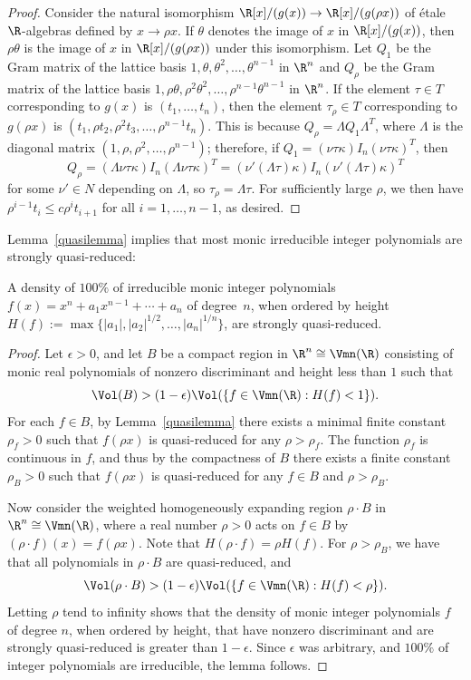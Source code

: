\begin{proof}
Consider the natural isomorphism $\R[x]/(g(x))\to \R[x]/(g(\rho x))$
of \'etale $\R$-algebras defined by $x\to\rho x$.  If $\theta$ denotes
the image of $x$ in $\R[x]/(g(x))$, then $\rho\theta$ is the image of
$x$ in $\R[x]/(g(\rho x))$ under this isomorphism.
Let $Q_1$ be the Gram matrix of the lattice basis
$1,\theta,\theta^2,\ldots,\theta^{n-1}$ in
$\R^{n}$ and $Q_\rho$ be the Gram matrix of the lattice basis
$1,\rho\theta,\rho^2\theta^2,\ldots,\rho^{n-1}\theta^{n-1}$ in
$\R^{n}$.  If the element $\tau \in T$
corresponding to $g(x)$ is $(t_1,\ldots,t_n)$, then the element
$\tau_\rho\in T$ corresponding to $g(\rho x)$ is $(t_1,\rho t_2,\rho^2
t_3,\ldots,\rho^{n-1}t_n)$. This is because $Q_\rho=\Lambda
Q_1\Lambda^T$, where $\Lambda$ is the diagonal matrix
$(1,\rho,\rho^2,\ldots,\rho^{n-1})$; therefore, if
$Q_1=(\nu\tau\kappa)I_n(\nu\tau\kappa)^T$, then $$Q_\rho=
(\Lambda\nu\tau\kappa)I_n(\Lambda\nu\tau\kappa)^T=(\nu'(\Lambda\tau)\kappa)I_n(\nu'(\Lambda\tau)\kappa)^T$$
for some $\nu'\in N$ depending on $\Lambda$, so
$\tau_\rho=\Lambda\tau$. For sufficiently large $\rho$, we then have
$\rho^{i-1}t_i\leq c\rho^{i}t_{i+1}$ for all $i=1,\ldots,n-1$, as
desired.
 \end{proof}


 Lemma~\ref{quasilemma} implies that most monic irreducible integer
 polynomials are strongly quasi-reduced:

\begin{lemma}
\notready\label{mostqr}
A density of $100\%$ of irreducible monic integer polynomials
$f(x)=x^n+a_1x^{n-1}+\cdots+a_n$ of degree~$n$, when ordered by
height $H(f):=\max\{|a_1|,|a_2|^{1/2},\ldots,|a_n|^{1/n}\}$,
are strongly quasi-reduced.
\end{lemma}

\begin{proof}
Let $\epsilon>0$, and let $B$ be a compact region in $\R^n\cong
\Vmn(\R)$ consisting of monic real polynomials of nonzero discriminant
and height less than $1$ such that $$\Vol(B)>(1-\epsilon)\Vol(\{f\in
\Vmn(\R):H(f)<1\}).$$ For each $f\in B$, by Lemma~\ref{quasilemma}
there exists a minimal finite constant $\rho_f>0$ such that $f(\rho
x)$ is quasi-reduced for any $\rho>\rho_f$. The function $\rho_f$ is
continuous in $f$, and thus by the compactness of $B$ there exists a
finite constant $\rho_B>0$ such that $f(\rho x)$ is quasi-reduced for
any $f\in B$ and $\rho>\rho_B$.

Now consider the weighted homogeneously expanding region $\rho\cdot B$
in $\R^n\cong \Vmn(\R)$, where a real number $\rho>0$ acts on $f\in B$
by $(\rho\cdot f)(x)=f(\rho x)$.  Note that $H(\rho\cdot f)=\rho
H(f)$.  For $\rho>\rho_B$, we have that all polynomials in $\rho\cdot
B$ are quasi-reduced, and
$$\Vol(\rho\cdot B)>(1-\epsilon)\Vol(\{f\in \Vmn(\R):H(f)<\rho\}).$$
Letting $\rho$ tend to infinity shows that the density of monic
integer polynomials $f$ of degree $n$, when ordered by height, that
have nonzero discriminant and are strongly quasi-reduced is greater
than $1-\epsilon$. Since $\epsilon$ was arbitrary, and $100\%$ of integer
polynomials are irreducible, the lemma follows.
\end{proof}

